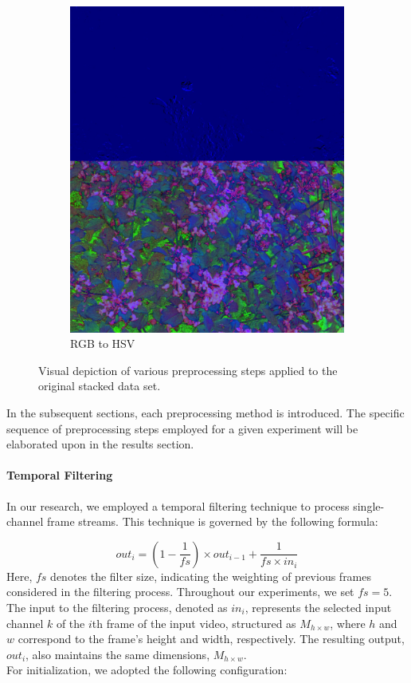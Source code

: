 \documentclass[sigchi,screen]{acmart}
\begin{document}
\begin{figure}[htp]
\begin{subfigure}{0.25\linewidth}
    \includegraphics[width=\linewidth]{figures/preprocessings/hsv.jpg}
    \caption{RGB to HSV}
  \end{subfigure}
  \caption{Visual depiction of various preprocessing steps applied to the original stacked data set.}
  \label{fig:preprocessings}
\end{figure}
In the subsequent sections, each preprocessing method is introduced. The specific sequence of preprocessing steps employed for a given experiment will be elaborated upon in the results section.

\paragraph{Temporal Filtering}
\label{ch:pp-tf}
In our research, we employed a temporal filtering technique to process single-channel frame streams. This technique is governed by the following formula:

\[
out_i = {\left(1 - \frac{1}{fs}\right)} \times out_{i-1} + \frac{1}{fs \times in_i} 
\] 
Here, $fs$ denotes the filter size, indicating the weighting of previous frames considered in the filtering process. Throughout our experiments, we set $fs = 5$. The input to the filtering process, denoted as $in_i$, represents the selected input channel $k$ of the $i$th frame of the input video, structured as $M_{h\times w}$, where $h$ and $w$ correspond to the frame's height and width, respectively. The resulting output, $out_i$, also maintains the same dimensions, $M_{h\times w}$. \\
For initialization, we adopted the following configuration:
\end{document}
